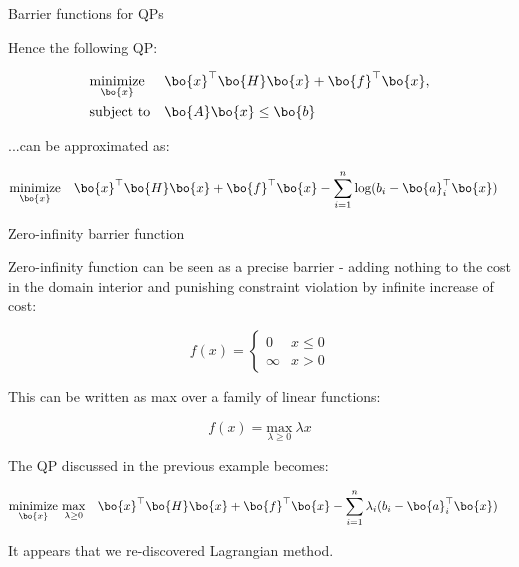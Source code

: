 \documentclass{beamer}
\begin{document}
\begin{frame}{Barrier functions for QPs}
\begin{flushleft}

Hence the following QP:

\begin{equation}
\begin{aligned}
& \underset{\bo{x}}{\text{minimize}}
& & \bo{x}^\top \bo{H} \bo{x} + \bo{f}^\top \bo{x}, \\
& \text{subject to}
& & 
\bo{A}\bo{x} \leq \bo{b}
\end{aligned}
\end{equation}
 
...can be approximated as:

\begin{equation}
\begin{aligned}
& \underset{\bo{x}}{\text{minimize}}
& & \bo{x}^\top \bo{H} \bo{x} + \bo{f}^\top \bo{x} - \sum\limits_{i = 1}^n \text{log} (b_i - \bo{a}_i^\top \bo{x})
\end{aligned}
\end{equation}
 
\end{flushleft}
\end{frame}





\begin{frame}{Zero-infinity barrier function}
	\begin{flushleft}
		
		Zero-infinity function can be seen as a precise barrier - adding nothing to the cost in the domain interior and punishing constraint violation by infinite increase of cost:
		
		\begin{equation}
		f(x) = 
		\begin{cases}
			0 &x \leq 0 \\
			\infty &x > 0
		\end{cases}
		\end{equation}
		
		This can be written as max over a family of linear functions:
		
		\begin{equation}
			f(x) = 
			\underset{\lambda \geq 0}{\text{max}}  \  \lambda x
		\end{equation}		
		
		The QP discussed in the previous example becomes:
		
		\begin{equation}
			\begin{aligned}
				& \underset{\bo{x}}{\text{minimize}} \ \underset{\lambda \geq 0}{\text{max}}
				& & \bo{x}^\top \bo{H} \bo{x} + \bo{f}^\top \bo{x} - \sum\limits_{i = 1}^n \lambda_i (b_i - \bo{a}_i^\top \bo{x})
			\end{aligned}
		\end{equation}
		
		It appears that we re-discovered Lagrangian method.
		
		
	\end{flushleft}
\end{frame}
\end{document}
